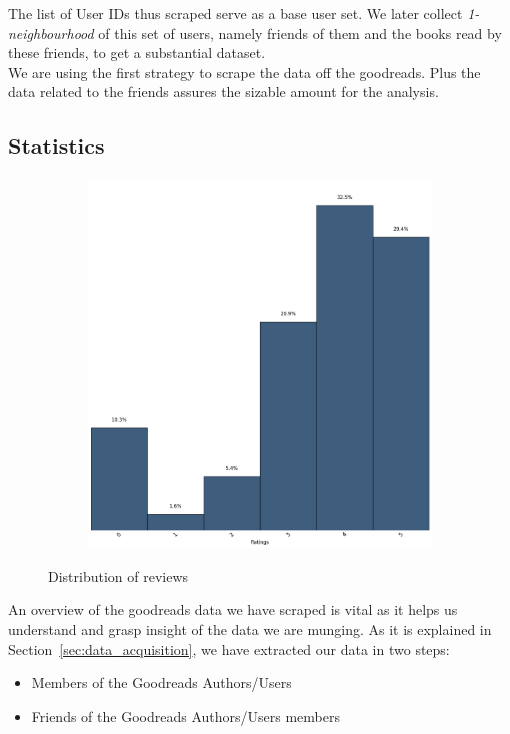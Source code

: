 \documentclass[11pt]{article}
\begin{document}
The list of User IDs thus scraped serve as a base user set. We later collect {\it 1-neighbourhood} of this set of users, namely friends of them and the books read by these friends, to get a substantial dataset.\\
We are using the first strategy to scrape the data off the goodreads. Plus the data related to the friends assures the sizable amount for the analysis.

\subsection{Statistics}

\begin{figure}[ht]
        \centering
        \begin{subfigure}[b]{0.5\textwidth}
                \includegraphics[width=\textwidth]{images/all_ratings}
                \label{fig:all_reviews}
        \end{subfigure}%
        \caption{Distribution of reviews}
\end{figure}


An overview of the goodreads data we have scraped is vital as it helps us understand and grasp insight of the data we are munging.
As it is explained in Section~\ref{sec:data_acquisition}, we have extracted our data in two steps:
\begin{itemize}
\item Members of the Goodreads Authors/Users
\item Friends of the Goodreads Authors/Users members
\end{itemize}
\end{document}
